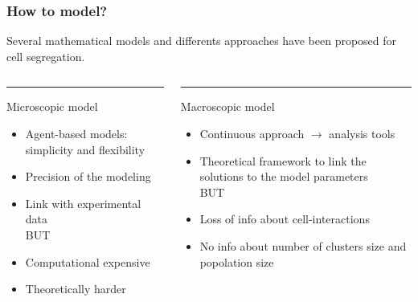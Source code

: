\documentclass[10pt]{beamer}
\begin{document}
\begin{frame}
\frametitle{How to model?}
Several mathematical models and differents approaches have been proposed for cell segregation. 

\vspace{0.5cm}
\begin{columns}[T] %
	\begin{column}{.48\textwidth}
		\color{blue}\rule{\linewidth}{4pt}
	Microscopic model	
	\begin{itemize}
		\item Agent-based models: simplicity and flexibility
		\item Precision of the modeling
		\item Link with experimental data \\
		\vspace{0.5cm}
		BUT
		\item Computational expensive
		\item Theoretically harder
		
	\end{itemize}
		
	\end{column}%
	\hfill%
	\begin{column}{.48\textwidth}
		\color{blue}\rule{\linewidth}{4pt}
	Macroscopic model	
		\begin{itemize}
		\item Continuous approach $\rightarrow$ analysis tools
		\item Theoretical framework to link the solutions to the model parameters \\
			\vspace{0.5cm}
		BUT
		\item Loss of info about cell-interactions
		\item No info about number of clusters size and popolation size
	\end{itemize}
		
	\end{column}%
\end{columns}
\end{frame}
\end{document}
